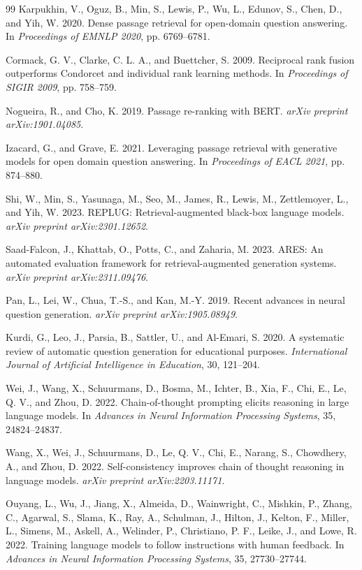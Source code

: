 \documentclass[12pt,a4paper]{article}
\begin{document}
\begin{thebibliography}{99}
Karpukhin, V., Oguz, B., Min, S., Lewis, P., Wu, L., Edunov, S.,
Chen, D., and Yih, W. 2020. Dense passage retrieval for open-domain
question answering. In \textit{Proceedings of EMNLP 2020}, pp. 6769--6781.

Cormack, G. V., Clarke, C. L. A., and Buettcher, S. 2009. Reciprocal rank
fusion outperforms Condorcet and individual rank learning methods. In
\textit{Proceedings of SIGIR 2009}, pp. 758--759.

Nogueira, R., and Cho, K. 2019. Passage re-ranking with BERT.
\textit{arXiv preprint arXiv:1901.04085}.

Izacard, G., and Grave, E. 2021. Leveraging passage retrieval with
generative models for open domain question answering. In
\textit{Proceedings of EACL 2021}, pp. 874--880.

Shi, W., Min, S., Yasunaga, M., Seo, M., James, R., Lewis, M.,
Zettlemoyer, L., and Yih, W. 2023. REPLUG: Retrieval-augmented black-box
language models. \textit{arXiv preprint arXiv:2301.12652}.

Saad-Falcon, J., Khattab, O., Potts, C., and Zaharia, M. 2023.
ARES: An automated evaluation framework for retrieval-augmented generation
systems. \textit{arXiv preprint arXiv:2311.09476}.

Pan, L., Lei, W., Chua, T.-S., and Kan, M.-Y. 2019.
Recent advances in neural question generation.
\textit{arXiv preprint arXiv:1905.08949}.

Kurdi, G., Leo, J., Parsia, B., Sattler, U., and Al-Emari, S. 2020.
A systematic review of automatic question generation for educational
purposes. \textit{International Journal of Artificial Intelligence in
Education}, 30, 121--204.

Wei, J., Wang, X., Schuurmans, D., Bosma, M., Ichter, B., Xia, F.,
Chi, E., Le, Q. V., and Zhou, D. 2022. Chain-of-thought prompting elicits
reasoning in large language models. In \textit{Advances in Neural
Information Processing Systems}, 35, 24824--24837.

Wang, X., Wei, J., Schuurmans, D., Le, Q. V., Chi, E., Narang, S.,
Chowdhery, A., and Zhou, D. 2022. Self-consistency improves chain of
thought reasoning in language models. \textit{arXiv preprint
arXiv:2203.11171}.

Ouyang, L., Wu, J., Jiang, X., Almeida, D., Wainwright, C., Mishkin, P.,
Zhang, C., Agarwal, S., Slama, K., Ray, A., Schulman, J., Hilton, J.,
Kelton, F., Miller, L., Simens, M., Askell, A., Welinder, P.,
Christiano, P. F., Leike, J., and Lowe, R. 2022. Training language models
to follow instructions with human feedback. In \textit{Advances in Neural
Information Processing Systems}, 35, 27730--27744.


\end{thebibliography}
\end{document}
